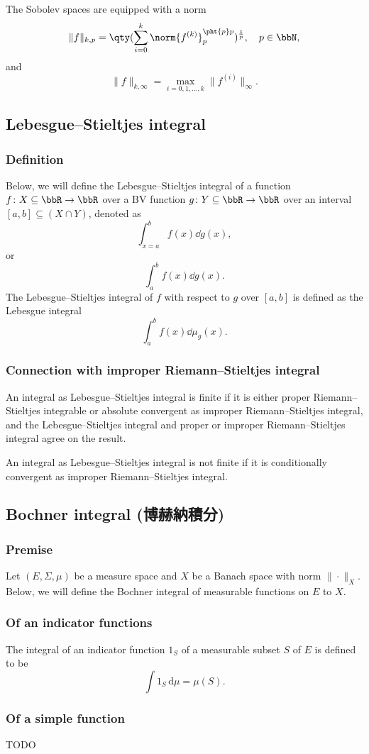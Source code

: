 The Sobolev spaces are equipped with a norm
\[\|f\|_{k,p}=\qty(\sum_{i=0}^k\norm{f^{(k)}}_p^{\pht{p}p})^{\frac{1}{p}},\quad p\in\bbN,\]
and
\[\|f\|_{k,\infty}=\max_{i=0,1,\ldots,k}\|f^{(i)}\|_{\infty}.\]
\subsection{Lebesgue–Stieltjes integral}
\subsubsection{Definition}
Below, we will define the Lebesgue–Stieltjes integral of a function $f\colon X\subseteq\bbR\to\bbR$ over a BV function $g\colon Y\subseteq\bbR\to\bbR$ over an interval $[a,b]\subseteq (X\cap Y)$, denoted as
\[\int_{x=a}^bf(x)\dd{g(x)},\]
or
\[\int_a^bf(x)\dd{g(x)}.\]
The Lebesgue–Stieltjes integral of $f$ with respect to $g$ over $[a,b]$ is defined as the Lebesgue integral
\[\int_a^bf(x)\dd{\mu_g(x)}.\]
\subsubsection{Connection with improper Riemann–Stieltjes integral}
An integral as Lebesgue–Stieltjes integral is finite if it is either proper Riemann–Stieltjes integrable or absolute convergent as improper Riemann–Stieltjes integral, and the Lebesgue–Stieltjes integral and proper or improper Riemann–Stieltjes integral agree on the result.

An integral as Lebesgue–Stieltjes integral is not finite if it is conditionally convergent as improper Riemann–Stieltjes integral.
\subsection{Bochner integral (博赫納積分)}
\subsubsection{Premise}
Let $(E,\Sigma ,\mu )$ be a measure space and $X$ be a Banach space with norm $\|\cdot\|_X$. Below, we will define the Bochner integral of measurable functions on $E$ to $X$.
\subsubsection{Of an indicator functions}
The integral of an indicator function $1_S$ of a measurable subset $S$ of $E$ is defined to be
\[\int 1_{S}\,\mathrm{d}{\mu} =\mu (S).\]
\subsubsection{Of a simple function}
TODO
